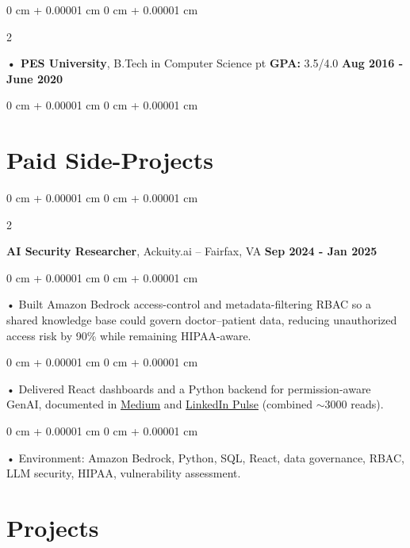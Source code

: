 \documentclass[10pt, letterpaper]{article}
\newenvironment{onecolentry}{
    \begin{adjustwidth}{
        0 cm + 0.00001 cm
    }{
        0 cm + 0.00001 cm
    }
}{
    \end{adjustwidth}
} %
\newenvironment{twocolentry}[2][]{
    \onecolentry
    \def\secondColumn{#2}
    \setcolumnwidth{\fill, 4.5 cm}
    \begin{paracol}{2}
}{
    \switchcolumn \raggedleft \secondColumn
    \end{paracol}
    \endonecolentry
} %
\begin{document}
        \begin{twocolentry}{
            \textbf{Aug 2016 - June 2020}
        }
            \textbf{ • PES University}, B.Tech in Computer Science  pt \textbf{GPA:} 3.5/4.0  \end{twocolentry}
        \begin{onecolentry}

                        \vspace{0.4cm}
    \section{Paid Side-Projects}
            \vspace{2 pt }
                    \begin{twocolentry}{
            \textbf{Sep 2024 - Jan 2025}
        }
            \textbf{AI Security Researcher}, Ackuity.ai -- Fairfax, VA\end{twocolentry}

        \begin{onecolentry}
             • Built Amazon Bedrock access-control and metadata-filtering RBAC so a shared knowledge base could govern doctor--patient data, reducing unauthorized access risk by 90\% while remaining HIPAA-aware.
        \end{onecolentry}
        \begin{onecolentry}
             • Delivered React dashboards and a Python backend for permission-aware GenAI, documented in \href{https://medium.com/@sreenikethaathreya/building-a-permission-aware-genai-application-on-amazon-bedrock-8fdc2410dd43}{Medium} and \href{https://www.linkedin.com/pulse/building-permission-aware-genai-application-amazon-bedrock-aathreya-g7nme/}{LinkedIn Pulse} (combined $\sim$3000 reads).
        \end{onecolentry}
        \begin{onecolentry}
             • Environment: Amazon Bedrock, Python, SQL, React, data governance, RBAC, LLM security, HIPAA, vulnerability assessment.

        \end{onecolentry}
             \vspace{2 pt }

        \vspace{0.4cm}
\section{Projects}
    \vspace{2 pt}
\end{onecolentry}
\end{document}
